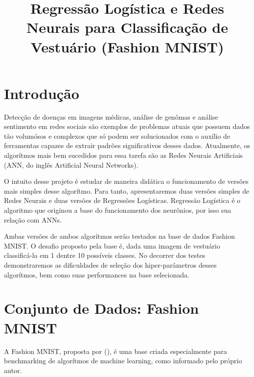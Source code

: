 \documentclass[conference]{IEEEtran}
\begin{document}
\renewcommand{\figurename}{Fig.}
\renewcommand{\refname}{Referências}

\title{Regressão Logística e Redes Neurais para Classificação de Vestuário (Fashion MNIST)}

\author{
\and
{}
}

\maketitle

\section{Introdução}	
	Detecção de doenças em imagens médicas, análise de genômas e análise sentimento em redes sociais são exemplos de problemas atuais que possuem dados tão volumósos e complexos que só podem ser solucionados com o auxílio de ferramentas capazes de extrair padrões significativos desses dados. Atualmente, os algorítmos mais bem sucedidos para essa tarefa são as Redes Neurais Artificiais (ANN, do inglês Artificial Neural Networks).
	
	O intuito desse projeto é estudar de maneira didática o funcionamento de versões mais simples desse algorítmo. Para tanto, apresentaremos duas versões simples de Redes Neurais e duas versões de Regressões Logísticas. Regressão Logística é o algoritmo que originou a base do funcionamento dos neurônios, por isso sua relação com ANNs.
	
	Ambas versões de ambos algorítmos serão testados na base de dados Fashion MNIST. O desafio proposto pela base é, dada uma imagem de vestuário classificá-la em 1 dentre 10 possíveis classes. No decorrer dos testes demonstraremos as dificuldades de seleção dos hiper-parâmetros desses algorítmos, bem como suas performances na base selecionada.
	
\section{Conjunto de Dados: Fashion MNIST}

	A Fashion MNIST, proposta por \citeauthor{xiao2017/online} (\citeyear{xiao2017/online}), é uma base criada especialmente para benchmarking de algorítmos de machine learning, como informado pelo próprio autor.
	
\end{document}
